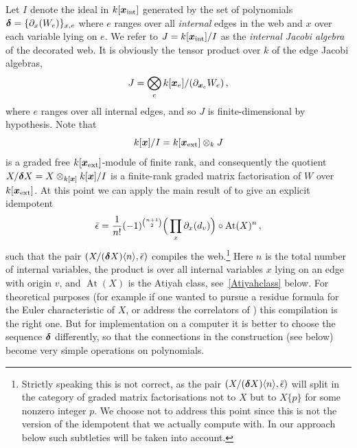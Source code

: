 \documentclass{compositio}
\theoremstyle{definition}
\numberwithin{equation}{section}
\DeclareMathOperator{\At}{At}
\begin{document}
Let $I$ denote the ideal in $k[\boldsymbol{x}_{\textup{int}}]$ generated by the set of polynomials $\boldsymbol{\delta} = \{\partial_x(W_e)\}_{x,e}$ where $e$ ranges over all \emph{internal} edges in the web and $x$ over each variable lying on $e$. We refer to $J = k[\boldsymbol{x}_{\textup{int}}]/I$ as the \emph{internal Jacobi algebra} of the decorated web. It is obviously the tensor product over $k$ of the edge Jacobi algebras, 
\[
J = \bigotimes_{e} k[\boldsymbol{x}_e]/(\partial_{\boldsymbol{x}_e} W_e) \, ,
\]
where $e$ ranges over all internal edges, and so $J$ is finite-dimensional by hypothesis. Note that
\[
k[\boldsymbol{x}]/I = k[\boldsymbol{x}_{\textup{ext}}] \otimes_k J
\]
is a graded free $k[\boldsymbol{x}_{\textup{ext}}]$-module of finite rank, and consequently the quotient $X/\boldsymbol{\delta} X = X \otimes_{k[\boldsymbol{x}]} k[\boldsymbol{x}]/I$ is a finite-rank graded matrix factorisation of $W$ over $k[\boldsymbol{x}_{\textup{ext}}]$. At this point we can apply the main result of \cite{dm1102.2957} to give an explicit idempotent
\[
\bar\idem = \frac{1}{n!}(-1)^{\binom{n+1}{2}} \Big(\prod_x \partial_x(d_v)\Big) \circ \At(X)^n\,,
\]
such that the pair $(X/(\boldsymbol{\delta} X)\langle n \rangle, \bar{\epsilon})$ compiles the web.\footnote{Strictly speaking this is not correct, as the pair $(X/(\boldsymbol{\delta} X)\langle n \rangle, \bar{\epsilon})$ will split in the category of graded matrix factorisations not to $X$ but to $X\{ p \}$ for some nonzero integer $p$. We choose not to address this point since this is not the version of the idempotent that we actually compute with. In our approach below such subtleties will be taken into account.} Here $n$ is the total number of internal variables, the product is over all internal variables $x$ lying on an edge with origin $v$, and $\At(X)$ is the Atiyah class, see~\eqref{Atiyahclass} below. For theoretical purposes (for example if one wanted to pursue a residue formula for the Euler characteristic of $X$, or address the correlators of \cite{kr0404189}) this compilation is the right one. But for implementation on a computer it is better to choose the sequence $\boldsymbol{\delta}$ differently, so that the connections in the construction (see below) become very simple operations on polynomials.
\\
\end{document}
